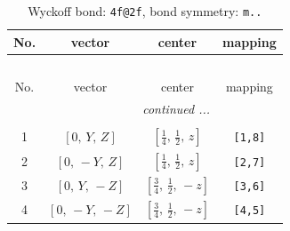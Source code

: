 \documentclass[fleqn,8pt]{jsarticle}
\begin{document}
\renewcommand{\arraystretch}{1.2}
\begin{longtable}{cccc}
\caption{Wyckoff bond: {\tt 4f@2f}, bond symmetry: {\tt m..}}
 \\
 \hline \hline
No. & vector & center & mapping \\ \hline \endfirsthead

\multicolumn{3}{l}{\tablename\ \thetable{}} \\
 \hline \hline
No. & vector & center & mapping \\ \hline \endhead

 \hline \hline
\multicolumn{3}{r}{\footnotesize\it continued ...} \\ \endfoot

 \hline \hline
\multicolumn{3}{r}{} \\ \endlastfoot

1 & $\left[ 0,\, Y,\, Z \right]$ & $\left[ \frac{1}{4},\, \frac{1}{2},\, z \right]$ & {\tt [1,8]} \\ \hline
2 & $\left[ 0,\, - Y,\, Z \right]$ & $\left[ \frac{1}{4},\, \frac{1}{2},\, z \right]$ & {\tt [2,7]} \\ \hline
3 & $\left[ 0,\, Y,\, - Z \right]$ & $\left[ \frac{3}{4},\, \frac{1}{2},\, - z \right]$ & {\tt [3,6]} \\ \hline
4 & $\left[ 0,\, - Y,\, - Z \right]$ & $\left[ \frac{3}{4},\, \frac{1}{2},\, - z \right]$ & {\tt [4,5]} \\
\end{longtable}
\renewcommand{\arraystretch}{1.2}
\end{document}
